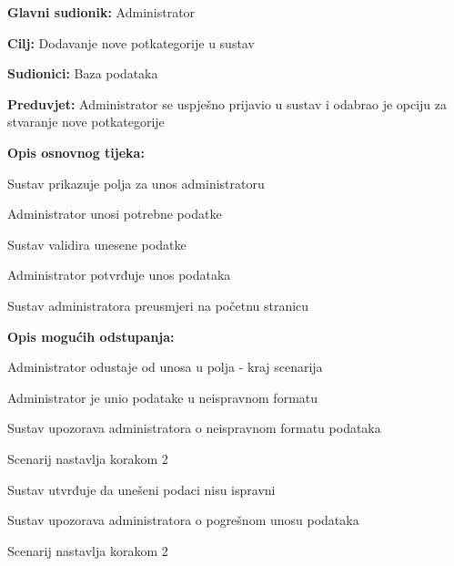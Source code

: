 					\noindent {}
					\begin{packed_item}
	
						\item \textbf{Glavni sudionik: }Administrator
						\item  \textbf{Cilj:} Dodavanje nove potkategorije u sustav
						\item  \textbf{Sudionici:} Baza podataka
						\item  \textbf{Preduvjet:} Administrator se uspješno prijavio u sustav i odabrao je opciju za stvaranje nove potkategorije
						\item  \textbf{Opis osnovnog tijeka:}
						
						\item[] \begin{packed_enum}
							\item Sustav prikazuje polja za unos administratoru
							\item Administrator unosi potrebne podatke
							\item Sustav validira unesene podatke
							\item Administrator potvrđuje unos podataka
							\item Sustav administratora preusmjeri na početnu stranicu
						\end{packed_enum}
						\eject
						\item  \textbf{Opis mogućih odstupanja:}

						\item[] \begin{packed_item}
							\item[2.a] Administrator odustaje od unosa u polja - kraj scenarija
							\item[3.a] Administrator je unio podatake u neispravnom formatu
							\item[] \begin{packed_enum}
								\item Sustav upozorava administratora o neispravnom formatu podataka
								\item Scenarij nastavlja korakom 2 
							\end{packed_enum}	
							\item[5.a] Sustav utvrđuje da unešeni podaci nisu ispravni
							\item[] \begin{packed_enum}
								\item Sustav upozorava administratora o pogrešnom unosu podataka
								\item Scenarij nastavlja korakom 2 
							\end{packed_enum}					
						\end{packed_item}
					\end{packed_item}
					
